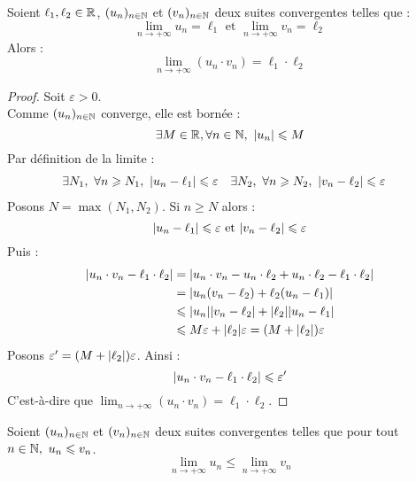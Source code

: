 \begin{theorem}
    Soient $\ell_1, \ell_2 \in \mathbb{R}$, $(u_n)_{n \in \mathbb{N}}$ et $(v_n)_{n \in \mathbb{N}}$ deux suites convergentes telles que :
    \[ \lim_{n \to + \infty} u_n = \ell_1 \text{ et } \lim_{n \to +\infty} v_n = \ell_2 \]
    Alors :
    \[ \lim_{n \to +\infty} (u_n \cdot v_n) = \ell_1 \cdot \ell_2 \]
\end{theorem}

\begin{proof}
    Soit $\varepsilon > 0$.
    \\
    Comme $(u_n)_{n \in \mathbb{N}}$ converge, elle est bornée :
    \[ \exists M \in \mathbb{R}, \forall n \in \mathbb{N},\ \abs{u_n} \leqslant M \]
    Par définition de la limite :
    \begin{align*}
        &\exists N_1,\ \forall n \geqslant N_1,\ \abs{u_n - \ell_1} \leqslant \varepsilon &
        &\exists N_2,\ \forall n \geqslant N_2,\ \abs{v_n - \ell_2} \leqslant \varepsilon
    \end{align*}
    Posons $N = \max(N_1, N_2)$. Si $n \geq N$ alors :
    \[ \abs{u_n - \ell_1} \leqslant \varepsilon \text{ et } \abs{v_n - \ell_2} \leqslant \varepsilon \]
    Puis : 
    \begin{align*}
        \abs{u_n \cdot v_n - \ell_1 \cdot \ell_2} &= \abs{u_n \cdot v_n - u_n \cdot \ell_2 + u_n \cdot \ell_2 - \ell_1 \cdot \ell_2} \\
        &= \abs{u_n(v_n - \ell_2) + \ell_2 (u_n - \ell_1)} \\ 
        &\leqslant \abs{u_n} \abs{v_n - \ell_2} + \abs{\ell_2} \abs{u_n - \ell_1} \\ 
        &\leqslant M \varepsilon + \abs{\ell_2} \varepsilon = (M + \abs{\ell_2}) \varepsilon
    \end{align*}
    Posons $\varepsilon' = (M + \abs{\ell_2}) \varepsilon$. Ainsi :
    \[ \abs{u_n \cdot v_n - \ell_1 \cdot \ell_2} \leqslant \varepsilon' \]
    C'est-à-dire que $\lim_{n \to +\infty} (u_n \cdot v_n) = \ell_1 \cdot \ell_2$.
\end{proof}

\begin{theorem}
    Soient $(u_n)_{n \in \mathbb{N}}$ et $(v_n)_{n \in \mathbb{N}}$ deux suites convergentes telles que pour tout $n \in \mathbb{N},\ u_n \leqslant v_n$. 
    \[ \lim_{n \to +\infty} u_n \leq \lim_{n \to +\infty} v_n \]
\end{theorem}

